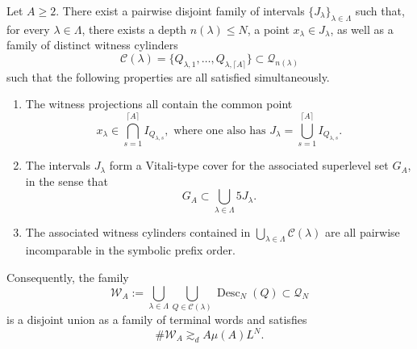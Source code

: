 \documentclass[12pt]{amsart}
\numberwithin{equation}{section}
\begin{document}
\begin{lemma}\label{lma:terminalmarking}
Let $A\geq2$.  There exist a pairwise disjoint family of intervals
$\{J_\lambda\}_{\lambda\in\Lambda}$ such that, for every $\lambda\in\Lambda$, there exists a
depth $n(\lambda)\leq N$, a point $x_\lambda\in J_\lambda$, as well as a family of distinct witness cylinders
\[
 \mathcal C(\lambda)
 =\{Q_{\lambda,1},\ldots,Q_{\lambda,\lceil A\rceil}\}
 \subset\mathscr Q_{n(\lambda)}
\]
such that the following properties are all satisfied simultaneously.
\begin{enumerate}
\item The witness projections all contain the common point
\[
 x_\lambda\in
 \bigcap_{s=1}^{\lceil A\rceil}I_{Q_{\lambda,s}},
 \textrm{ where one also has }
 J_\lambda=\bigcup_{s=1}^{\lceil A\rceil}I_{Q_{\lambda,s}}.
\]
\item The intervals $J_{\lambda}$ form a Vitali-type cover for the associated superlevel set $G_A$, in the sense that
\[
 G_A\subset\bigcup_{\lambda\in\Lambda}5J_\lambda.
\]
\item The associated witness cylinders contained in
$\bigcup_{\lambda\in\Lambda}\mathcal C(\lambda)$ are all pairwise incomparable
in the symbolic prefix order.
\end{enumerate}
Consequently, the family
\begin{equation}\label{eq:terminal-marked-family}
 \mathscr W_A
 :=\bigcup_{\lambda\in\Lambda}
   \bigcup_{Q\in\mathcal C(\lambda)}
   \operatorname{Desc}_N(Q)
 \subset\mathscr Q_N
\end{equation}
is a disjoint union as a family of terminal words and satisfies
\begin{equation}\label{eq:markedterminalcount}
 \#\mathscr W_A\gtrsim_d A\mu(A)L^N.
\end{equation}
\end{lemma}
\end{document}
